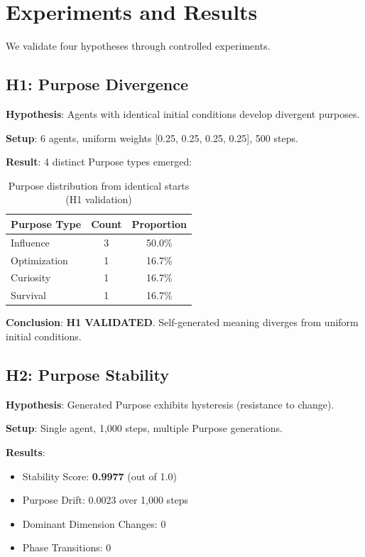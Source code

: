 \documentclass{article}
\begin{document}
\section{Experiments and Results}

We validate four hypotheses through controlled experiments.

\subsection{H1: Purpose Divergence}

\textbf{Hypothesis}: Agents with identical initial conditions develop divergent purposes.

\textbf{Setup}: 6 agents, uniform weights [0.25, 0.25, 0.25, 0.25], 500 steps.

\textbf{Result}: 4 distinct Purpose types emerged:

\begin{table}[h]
\centering
\begin{tabular}{lcc}
\toprule
\textbf{Purpose Type} & \textbf{Count} & \textbf{Proportion} \\
\midrule
Influence & 3 & 50.0\% \\
Optimization & 1 & 16.7\% \\
Curiosity & 1 & 16.7\% \\
Survival & 1 & 16.7\% \\
\bottomrule
\end{tabular}
\caption{Purpose distribution from identical starts (H1 validation)}
\end{table}

\textbf{Conclusion}: \textbf{H1 VALIDATED}. Self-generated meaning diverges from uniform initial conditions.

\subsection{H2: Purpose Stability}

\textbf{Hypothesis}: Generated Purpose exhibits hysteresis (resistance to change).

\textbf{Setup}: Single agent, 1,000 steps, multiple Purpose generations.

\textbf{Results}:
\begin{itemize}
    \item Stability Score: \textbf{0.9977} (out of 1.0)
    \item Purpose Drift: 0.0023 over 1,000 steps
    \item Dominant Dimension Changes: 0
    \item Phase Transitions: 0
\end{itemize}
\end{document}
